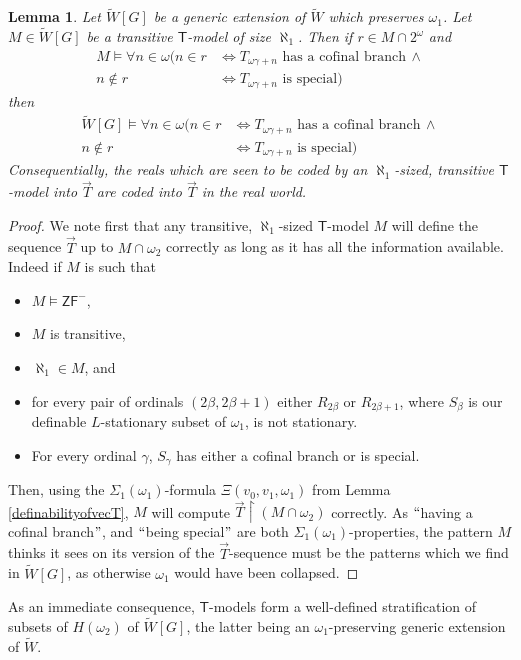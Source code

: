 \documentclass[a4paper,12pt]{article}
\newtheorem{lemma}[theorem]{Lemma}
\newcommand{\ZFP}{\mathsf{ZF}^-}
\newcommand{\T}{\mathsf{T}}
\begin{document}
\begin{lemma}
Let $\tilde{W}[G]$ be a generic extension of $\tilde{W}$ which preserves $\omega_1$. Let $M \in \tilde{W}[G]$ be a transitive $\T$-model  of size $\aleph_1$. Then if $r \in M\cap 2^{\omega}$ and
\begin{align*}
M \models \forall n \in \omega ( n \in r &\Leftrightarrow T_{\omega \gamma + n} \text{ has a cofinal branch} \, \land \\
n \notin r & \Leftrightarrow T_{\omega \gamma + n } \text{ is special})
\end{align*} 
then 
\begin{align*}
\tilde{W}[G] \models \forall n \in \omega ( n \in r &\Leftrightarrow T_{\omega \gamma + n} \text{ has a cofinal branch} \, \land \\
n \notin r & \Leftrightarrow T_{\omega \gamma + n } \text{ is special})
\end{align*} 
Consequentially, the reals which are seen to be coded by an $\aleph_1$-sized, transitive $\T$-model into $\vec{T}$ are coded into $\vec{T}$ in the real world.
\end{lemma}
\begin{proof}
We note first that any transitive, $\aleph_1$-sized $\T$-model $M$ will define the sequence $\vec{T}$ up to $M \cap \omega_2$ correctly as long as it has all the information available. Indeed if $M$ is such that
\begin{itemize}
\item $M \models \ZFP$,
\item $M$ is transitive,
\item $\aleph_1 \in M$, and
\item for every pair of ordinals $(2\beta, 2\beta+1)$ either $R_{2\beta}$ or $R_{2\beta+1}$, where $S_{\beta}$ is our definable $L$-stationary subset of $\omega_1$, is not stationary.
\item For every ordinal $\gamma$, $S_{\gamma}$ has either a cofinal branch or is special.
\end{itemize}
Then, using the $\Sigma_1(\omega_1)$-formula $\Xi(v_0,v_1,\omega_1)$ from Lemma \ref{definabilityofvecT}, $M$ will compute $\vec{T} \upharpoonright (M \cap \omega_2)$ correctly. As $``$having a cofinal branch$"$, and $``$being special$"$ are both $\Sigma_1(\omega_1)$-properties, the pattern $M$ thinks it sees on its version of the $\vec{T}$-sequence must be the patterns which we find in $\tilde{W}[G]$, as otherwise $\omega_1$ would have been collapsed.

\end{proof}
As an immediate consequence, $\T$-models form a well-defined stratification of subsets of $H(\omega_2)$ of $\tilde{W}[G]$, the latter being an $\omega_1$-preserving generic extension of $\tilde{W}$.
\end{document}
